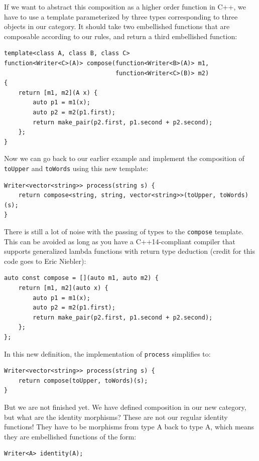 If we want to abstract this composition as a higher order function in
C++, we have to use a template parameterized by three types
corresponding to three objects in our category. It should take two
embellished functions that are composable according to our rules, and
return a third embellished function:

\begin{verbatim}
template<class A, class B, class C>
function<Writer<C>(A)> compose(function<Writer<B>(A)> m1,
                               function<Writer<C>(B)> m2)
{
    return [m1, m2](A x) {
        auto p1 = m1(x);
        auto p2 = m2(p1.first);
        return make_pair(p2.first, p1.second + p2.second); 
    };
}
\end{verbatim}

Now we can go back to our earlier example and implement the composition
of \texttt{toUpper} and \texttt{toWords} using this new template:

\begin{verbatim}
Writer<vector<string>> process(string s) { 
    return compose<string, string, vector<string>>(toUpper, toWords)(s);
}
\end{verbatim}

There is still a lot of noise with the passing of types to the
\texttt{compose} template. This can be avoided as long as you have a
C++14-compliant compiler that supports generalized lambda functions with
return type deduction (credit for this code goes to Eric Niebler):

\begin{verbatim}
auto const compose = [](auto m1, auto m2) { 
    return [m1, m2](auto x) { 
        auto p1 = m1(x);
        auto p2 = m2(p1.first);
        return make_pair(p2.first, p1.second + p2.second);
    };
};
\end{verbatim}

In this new definition, the implementation of \texttt{process}
simplifies to:

\begin{verbatim}
Writer<vector<string>> process(string s) {
    return compose(toUpper, toWords)(s);
}
\end{verbatim}

But we are not finished yet. We have defined composition in our new
category, but what are the identity morphisms? These are not our regular
identity functions! They have to be morphisms from type A back to type
A, which means they are embellished functions of the form:

\begin{verbatim}
Writer<A> identity(A);
\end{verbatim}

